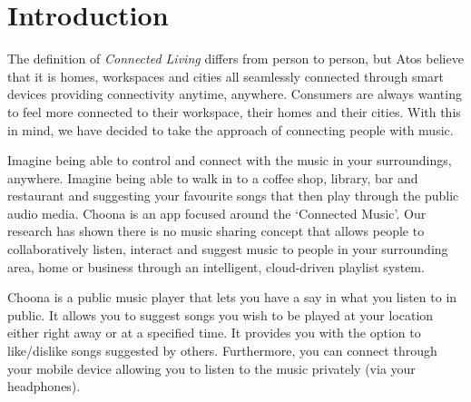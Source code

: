 \section{Introduction}

The definition of \emph{Connected Living} differs from person to person, but Atos believe that it is homes, workspaces and cities all seamlessly connected through smart devices providing connectivity anytime, anywhere.  Consumers are always wanting to feel more connected to their workspace, their homes and their cities.  With this in mind, we have decided to take the approach of connecting people with music.  

Imagine being able to control and connect with the music in your surroundings, anywhere.  Imagine being able to walk in to a coffee shop, library, bar and restaurant and suggesting your favourite songs that then play through the public audio media.  Choona is an app focused around the `Connected Music'.  Our research has shown there is no music sharing concept that allows people to collaboratively listen, interact and suggest music to people in your surrounding area, home or business through an intelligent, cloud-driven playlist system.  

Choona is a public music player that lets you have a say in what you listen to in public.  It allows you to suggest songs you wish to be played at your location either right away or at a specified time.  It provides you with the option to like/dislike songs suggested by others.  Furthermore, you can connect through your mobile device allowing you to listen to the music privately (via your headphones).